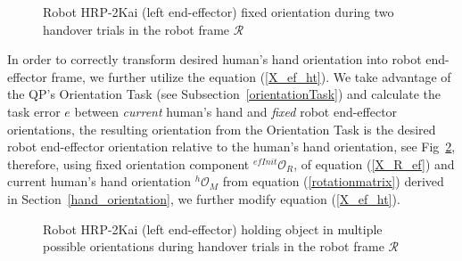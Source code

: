 \begin{figure}[ht]
	\caption{Robot HRP-2Kai (left end-effector) fixed orientation during two handover trials in the robot frame $\mathcal{R}$}
	\label{fig:robot_lt_hand_2layers}
\end{figure} 


In order to correctly transform desired human's hand orientation into robot end-effector frame, we further utilize the equation (\ref{X_ef_ht}). We take advantage of the QP's Orientation Task (see Subsection~\ref{orientationTask}) and calculate the task error $e$ between \textit{current} human's hand and \textit{fixed} robot end-effector orientations,
the resulting orientation from the Orientation Task is the desired robot end-effector orientation relative to the human's hand orientation, see Fig~\ref{fig:robot_lt_orientations}, therefore, using fixed orientation component  ${{}^{efInit}\mathcal{O}_R}$, of equation (\ref{X_R_ef}) and current human's hand orientation ${}^{h}\mathcal{O}_M$ from equation (\ref{rotationmatrix}) derived in Section~\ref{hand_orientation}, we further modify equation (\ref{X_ef_ht}).

\begin{figure}[ht]
	\caption{Robot HRP-2Kai (left end-effector) holding object in multiple possible orientations during handover trials in the robot frame $\mathcal{R}$}
	\label{fig:robot_lt_orientations}
\end{figure} 


